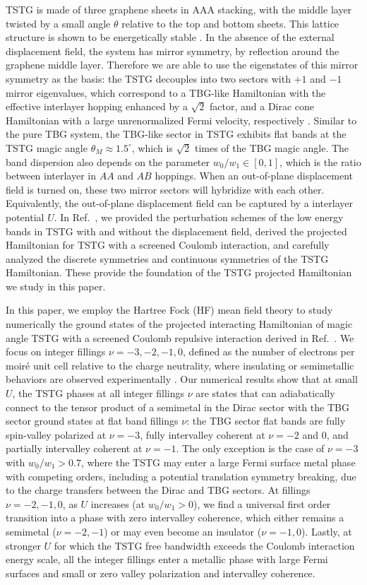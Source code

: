 \documentclass[prb,aps,nofootinbib,amssymb,twocolumn,superscriptaddress,10pt]{revtex4-2}
\begin{document}
TSTG is made of three graphene sheets in AAA stacking, with the middle layer twisted by a small angle $\theta$ relative to the top and bottom sheets. This lattice structure is shown to be energetically stable \cite{CAR20}. In the absence of the external displacement field, the system has mirror symmetry, by reflection around the graphene middle layer. Therefore we are able to use the eigenstates of this mirror symmetry as the basis: the TSTG decouples into two sectors with $+1$ and $-1$ mirror eigenvalues, which correspond to a TBG-like Hamiltonian with the effective interlayer hopping enhanced by a $\sqrt2$ factor, and a Dirac cone Hamiltonian with a large unrenormalized Fermi velocity, respectively \cite{KHA19}. Similar to the pure TBG system, the TBG-like sector in TSTG exhibits flat bands at the TSTG magic angle $\theta_M\approx1.5^\circ$, which is $\sqrt{2}$ times of the TBG magic angle. The band dispersion also depends on the parameter $w_0/w_1\in[0,1]$, which is the ratio between interlayer in $AA$ and $AB$ hoppings. When an out-of-plane displacement field is turned on, these two mirror sectors will hybridize with each other. Equivalently, the out-of-plane displacement field can be captured by a interlayer potential $U$.
In Ref.~\cite{TSTGI}, we provided the perturbation schemes of the low energy bands in TSTG with and without the displacement field, derived the projected Hamiltonian for TSTG with a screened Coulomb interaction, and carefully analyzed the discrete symmetries and continuous symmetries of the TSTG Hamiltonian.
These provide the foundation of the TSTG projected Hamiltonian we study in this paper.

In this paper, we employ the Hartree Fock (HF) mean field theory to study numerically the ground states of the projected interacting Hamiltonian of magic angle TSTG with a screened Coulomb repulsive interaction derived in Ref.~\cite{TSTGI}. We focus on integer fillings $\nu=-3,-2,-1,0$, defined as the number of electrons per moir\'e unit cell relative to the charge neutrality, where insulating or semimetallic behaviors are observed experimentally \cite{HAO20,PAR20,CAO21}. Our numerical results show that at small $U$, the TSTG phases at all integer fillings $\nu$ are states that can adiabatically connect to the tensor product of a semimetal in the Dirac sector with the TBG sector ground states at flat band fillings $\nu$: the TBG sector flat bands are fully spin-valley polarized at $\nu=-3$, fully intervalley coherent at $\nu=-2$ and $0$, and partially intervalley coherent at $\nu=-1$. The only exception is the case of $\nu=-3$ with $w_0/w_1>0.7$, where the TSTG may enter a large Fermi surface metal phase with competing orders, including a potential translation symmetry breaking, due to the charge transfers between the Dirac and TBG sectors. At fillings $\nu=-2,-1,0$, as $U$ increases (at $w_0/w_1>0$), we find a universal first order transition into a phase with zero intervalley coherence, which either remains a semimetal ($\nu=-2,-1$) or may even become an insulator ($\nu=-1,0$). Lastly, at stronger $U$ for which the TSTG free bandwidth exceeds the Coulomb interaction energy scale, all the integer fillings enter a metallic phase with large Fermi surfaces and small or zero valley polarization and intervalley coherence.
\end{document}
